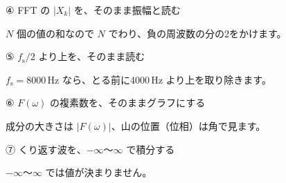 \begingroup{}%
\noindent\begin{minipage}[t]{0.485\linewidth}\vspace{0pt}
\begin{tsumazuki}{④ FFT の $|X_k|$ を、そのまま振幅と読む}
\raggedright{}
$N$ 個の値の和なので $N$ でわり、負の周波数の分の2をかけます。
\end{tsumazuki}
\end{minipage}\hfill
\begin{minipage}[t]{0.485\linewidth}\vspace{0pt}
\begin{tsumazuki}{⑤ $f_{\mathrm s}/2$ より上を、そのまま読む}
\raggedright{}
$f_{\mathrm s}=8000$\,Hz なら、とる前に4000\,Hz より上を取り除きます。
\end{tsumazuki}
\end{minipage}\par
\endgroup

\begingroup{}%
\noindent\begin{minipage}[t]{0.485\linewidth}\vspace{0pt}
\begin{tsumazuki}{⑥ $F(\omega)$ の複素数を、そのままグラフにする}
\raggedright{}
成分の大きさは $|F(\omega)|$、山の位置（位相）は角で見ます。
\end{tsumazuki}
\end{minipage}\hfill
\begin{minipage}[t]{0.485\linewidth}\vspace{0pt}
\begin{tsumazuki}{⑦ くり返す波を、$-\infty$〜$\infty$ で積分する}
\raggedright{}
$-\infty$〜$\infty$ では値が決まりません。
\end{tsumazuki}
\end{minipage}\par
\endgroup


